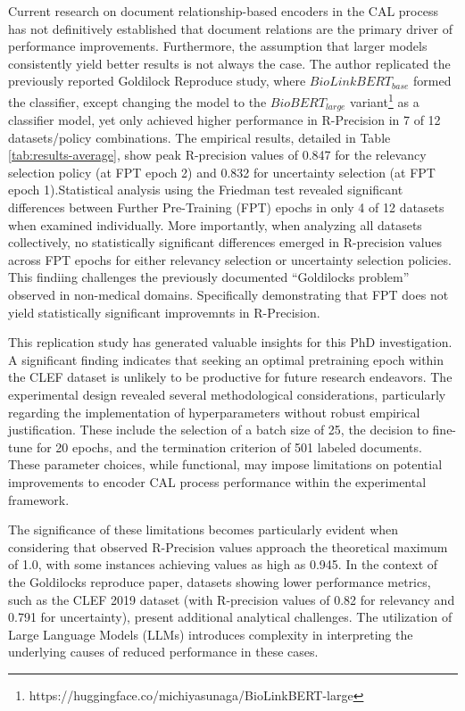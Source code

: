 \documentclass[../main.tex]{subfiles}
\begin{document}
Current research on document relationship-based encoders in the CAL process has not definitively established that document relations are the primary driver of performance improvements. Furthermore, the assumption that larger models consistently yield better results is not always the case. The author replicated the previously reported Goldilock Reproduce study, where $BioLinkBERT_{base}$ formed the classifier, except changing the model to the $BioBERT_{large}$ variant\footnote{https://huggingface.co/michiyasunaga/BioLinkBERT-large} as a classifier model, yet only achieved higher performance in R-Precision in 7 of 12 datasets/policy combinations.  The empirical results, detailed in Table \ref{tab:results-average}, show peak R-precision values of 0.847 for the relevancy selection policy (at FPT epoch 2) and 0.832 for uncertainty selection (at FPT epoch 1).Statistical analysis using the Friedman test revealed significant differences between Further Pre-Training (FPT) epochs in only 4 of 12 datasets when examined individually. More importantly, when analyzing all datasets collectively, no statistically significant differences emerged in R-precision values across FPT epochs for either relevancy selection or uncertainty selection policies. This findiing challenges the previously documented  ``Goldilocks problem'' observed in non-medical domains. Specifically demonstrating that FPT does not yield statistically significant improvemnts in R-Precision. 

This replication study has generated valuable insights for this PhD investigation. A significant finding indicates that seeking an optimal pretraining epoch within the CLEF dataset is unlikely to be productive for future research endeavors. The experimental design revealed several methodological considerations, particularly regarding the implementation of hyperparameters without robust empirical justification. These include the selection of a batch size of 25, the decision to fine-tune for 20 epochs, and the termination criterion of 501 labeled documents. These parameter choices, while functional, may impose limitations on potential improvements to encoder CAL process performance within the experimental framework.

The significance of these limitations becomes particularly evident when considering that observed R-Precision values approach the theoretical maximum of 1.0, with some instances achieving values as high as 0.945. In the context of the Goldilocks reproduce paper, datasets showing lower performance metrics, such as the CLEF 2019 dataset (with R-precision values of 0.82 for relevancy and 0.791 for uncertainty), present additional analytical challenges. The utilization of Large Language Models (LLMs) introduces complexity in interpreting the underlying causes of reduced performance in these cases.
\end{document}
